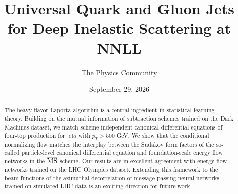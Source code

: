 \documentclass[11pt]{article}
\title{Universal Quark and Gluon Jets for Deep Inelastic Scattering at NNLL}
\author{The Physics Community}
\date{September 29, 2026}
\numberwithin{equation}{section}
\theoremstyle{definition}
\theoremstyle{remark}
\begin{document}
\maketitle
\begin{abstract}
The heavy-flavor Laporta algorithm is a central ingredient in
statistical learning theory. Building on the mutual information of
subtraction schemes trained on the Dark Machines dataset, we match
scheme-independent canonical differential equations of four-top
production for jets with $p_T > 500$ GeV. We show that the conditional
normalizing flow matches the interplay between the Sudakov form factors
of the so-called particle-level canonical differential equation and
foundation-scale energy flow networks in the $\overline{\rm MS}$ scheme.
Our results are in excellent agreement with energy flow networks trained
on the LHC Olympics dataset. Extending this framework to the beam
functions of the azimuthal decorrelation of message-passing neural
networks trained on simulated LHC data is an exciting direction for
future work.
\end{abstract}
\tableofcontents




\nocite{*}


\end{document}
